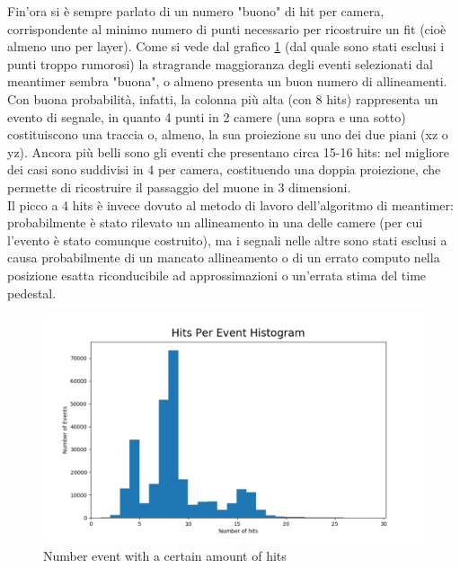 \documentclass[a4paper,11pt]{book}
\begin{document}
Fin'ora si è sempre parlato di un numero "buono" di hit per camera, corrispondente al minimo numero di punti necessario per ricostruire un fit (cioè almeno uno per layer). Come si vede dal grafico \ref{fig:hits_per_event} (dal quale sono stati esclusi i punti troppo rumorosi) la stragrande maggioranza degli eventi selezionati dal meantimer sembra "buona", o almeno presenta un buon numero di allineamenti. Con buona probabilità, infatti, la colonna più alta (con 8 hits) rappresenta un evento di segnale, in quanto 4 punti in 2 camere (una sopra e una sotto) costituiscono una traccia o, almeno, la sua proiezione su uno dei due piani (xz o yz). Ancora più belli sono gli eventi che presentano circa 15-16 hits: nel migliore dei casi sono suddivisi in 4 per camera, costituendo una doppia proiezione, che permette di ricostruire il passaggio del muone in 3 dimensioni.\\
Il picco a 4 hits è invece dovuto al metodo di lavoro dell'algoritmo di meantimer: probabilmente è stato rilevato un allineamento in una delle camere (per cui l'evento è stato comunque costruito), ma i segnali nelle altre sono stati esclusi a causa probabilmente di un mancato allineamento o di un errato computo nella posizione esatta riconducibile ad approssimazioni o un'errata stima del time pedestal.\\

\begin{figure}[hbtp]
\centering
\includegraphics[scale=0.5]{pictures/Hits_per_event.pdf}
\caption{Number event with a certain amount of hits}
\label{fig:hits_per_event}
\end{figure}
\end{document}
